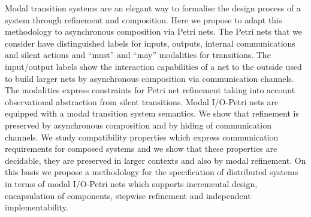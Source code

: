 Modal transition systems are an elegant way to formalise the design process of a system through refinement
and composition. Here we propose to adapt this methodology to asynchronous composition via Petri nets. 
The Petri nets that we consider have distinguished labels for inputs, outputs, internal communications and silent actions and  ``must'' and ``may''
modalities for transitions. The input/output labels show the interaction capabilities of a net to the outside used to build
larger nets by asynchronous composition via communication channels. The modalities express constraints for Petri net refinement
taking into account observational abstraction from silent transitions.
Modal I/O-Petri nets are equipped with a modal transition system semantics.
We show that refinement  is preserved by asynchronous composition and by hiding of communication channels.
We study compatibility properties which express communication
requirements for composed systems and we show that these properties are decidable,
they are preserved in larger contexts and also by modal refinement.
On this basis we propose a methodology for the specification of distributed systems
in terms of modal I/O-Petri nets which supports incremental design, encapsulation of components, stepwise refinement and independent implementability.
